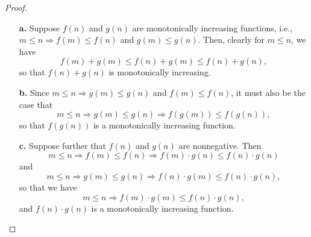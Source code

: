 
\begin{proof}
    \begin{itemize}
        \item[\textbf{a.}] Suppose $f(n)$ and $g(n)$ are monotonically increasing 
            functions, i.e., $m \leq n \Rightarrow f(m) \leq f(n)$ and
            $g(m) \leq g(n)$. Then, clearly for $m \leq n$, we have
            \[
                f(m) + g(m) \leq f(n) + g(m) \leq f(n) + g(n),
            \]
            so that $f(n) + g(n)$ is monotonically increasing.
        \item[\textbf{b.}] Since $m \leq n \Rightarrow g(m) \leq g(n)$ and 
            $f(m) \leq f(n)$, it must also be the case that 
            \[
                m \leq n \Rightarrow g(m) \leq g(n) \Rightarrow f(g(m)) \leq f(g(n)),
            \]
            so that $f(g(n))$ is a monotonically increasing function.
        \item[\textbf{c.}] Suppose further that $f(n)$ and $g(n)$ are nonnegative.
            Then 
            \[
                m \leq n \Rightarrow f(m) \leq f(n) \Rightarrow f(m) \cdot g(n) 
                \leq f(n) \cdot g(n)
            \]
            and
            \[
                m \leq n \Rightarrow g(m) \leq g(n) \Rightarrow f(n) \cdot g(m) 
                \leq f(n) \cdot g(n),
            \]
            so that we have
            \[
                m \leq n \Rightarrow f(m) \cdot g(m) \leq f(n) \cdot g(n), 
            \]
            and $f(n) \cdot g(n)$ is a monotonically increasing function.
    \end{itemize}
\end{proof}
